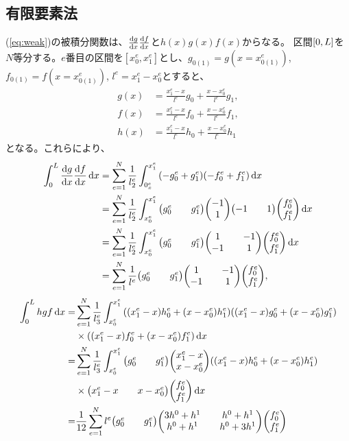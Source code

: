 \documentclass[xelatex,ja=standard]{bxjsarticle}
\begin{document}
\subsection{有限要素法}
(\ref{eq:weak})の被積分関数は、$\dv{g}{x}\dv{f}{x}$と$h(x)g(x)f(x)$からなる。
区間$\qty[0,L]$を$N$等分する。$e$番目の区間を$[x^e_0,x^e_1]$とし、$g_{0(1)} = g(x=x^e_{0(1)})$, $f_{0(1)} = f(x=x^e_{0(1)})$, $l^e = x^e_1 - x^e_0$とすると、
\begin{align}
    g(x) &= \frac{x^e_1 - x}{l^e}g_0 + \frac{x-x^e_0}{l^e}g_1,\\
    f(x) &= \frac{x^e_1 - x}{l^e}f_0 + \frac{x-x^e_0}{l^e}f_1,\\
    h(x) &= \frac{x^e_1 - x}{l^e}h_0 + \frac{x-x^e_0}{l^e}h_1
\end{align}
となる。これらにより、
\begin{align}
    \int_0^L \dv{g}{x}\dv{f}{x}\dd{x} 
    &= \sum_{e=1}^N \frac{1}{l^e_2}\int_{0_x^e}^{x^e_1}\qty(-g^e_0 + g^e_1)\qty(-f^e_0 + f^e_1)\dd{x}\notag\\
    &= \sum_{e=1}^N \frac{1}{l^e_2}\int_{x^e_0}^{x^e_1}\mqty(g^e_0 && g^e_1)\mqty(-1\\1)\mqty(-1 && 1)\mqty(f^e_0 \\ f^e_1)\dd{x}\notag\\
    &= \sum_{e=1}^N \frac{1}{l^e_2}\int_{x^e_0}^{x^e_1}\mqty(g^e_0 && g^e_1)\mqty(1 && -1 \\ -1 && 1)\mqty(f^e_0 \\ f^e_1)\dd{x}\notag\\
    &= \sum_{e=1}^N \frac{1}{l^e}\mqty(g^e_0 && g^e_1)\mqty(1 && -1 \\ -1 && 1)\mqty(f^e_0 \\ f^e_1),
\end{align}
\begin{align}
    \int_0^L hgf\dd{x}
    =& \sum_{e=1}^N \frac{1}{l^e_3}\int_{x^e_0}^{x^e_1}
    \qty(\qty(x^e_1 - x)h^e_0 + \qty(x-x^e_0)h^e_1)
    \qty(\qty(x^e_1 - x)g^e_0 + \qty(x-x^e_0)g^e_1)\notag\\
    &\times\qty(\qty(x^e_1 - x)f^e_0 + \qty(x-x^e_0)f^e_1)
    \dd{x}\notag\\
    =& \sum_{e=1}^N \frac{1}{l^e_3}\int_{x^e_0}^{x^e_1}
    \mqty(g^e_0 && g^e_1) \mqty(x^e_1 - x \\ x-x^e_0)
    \qty(\qty(x^e_1 - x)h^e_0 + \qty(x-x^e_0)h^e_1)\notag\\
    &\times\mqty(x^e_1 - x && x-x^e_0)\mqty(f^e_0 \\ f^e_1)
    \dd{x}\notag\\
    =& \frac{1}{12}\sum_{e=1}^N l^e
    \mqty(g^e_0 && g^e_1) \mqty(3h^0 +h^1 && h^0 +h^1\\ h^0 +h^1&&h^0 +3h^1)\mqty(f^e_0 \\ f^e_1)
\end{align}
\end{document}
